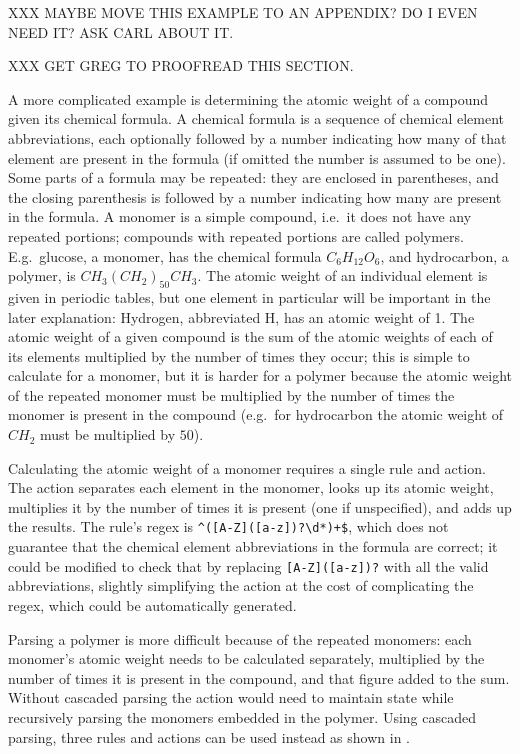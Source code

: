 XXX MAYBE MOVE THIS EXAMPLE TO AN APPENDIX\@?  DO I EVEN NEED IT\@?  ASK
CARL ABOUT IT\@.

XXX GET GREG TO PROOFREAD THIS SECTION\@.

A more complicated example is determining the atomic weight of a compound
given its chemical formula.  A chemical formula is a sequence of chemical
element abbreviations, each optionally followed by a number indicating how
many of that element are present in the formula (if omitted the number is
assumed to be one).  Some parts of a formula may be repeated: they are
enclosed in parentheses, and the closing parenthesis is followed by a
number indicating how many are present in the formula.  A monomer is a
simple compound, i.e.\ it does not have any repeated portions; compounds
with repeated portions are called polymers.  E.g.\ glucose, a monomer, has
the chemical formula $C_{6}H_{12}O_{6}$, and hydrocarbon, a polymer, is
$CH_{3}{(CH_{2})}_{50}CH_{3}$.  The atomic weight of an individual element
is given in periodic tables, but one element in particular will be
important in the later explanation: Hydrogen, abbreviated H, has an atomic
weight of 1.  The atomic weight of a given compound is the sum of the
atomic weights of each of its elements multiplied by the number of times
they occur; this is simple to calculate for a monomer, but it is harder for
a polymer because the atomic weight of the repeated monomer must be
multiplied by the number of times the monomer is present in the compound
(e.g.\ for hydrocarbon the atomic weight of $CH_{2}$ must be multiplied by
$50$).

Calculating the atomic weight of a monomer requires a single rule and
action.  The action separates each element in the monomer, looks up its
atomic weight, multiplies it by the number of times it is present (one if
unspecified), and adds up the results.  The rule's regex is
\verb!^([A-Z]([a-z])?\d*)+$!, which does not guarantee that the chemical
element abbreviations in the formula are correct; it could be modified to
check that by replacing \verb![A-Z]([a-z])?! with all the valid
abbreviations, slightly simplifying the action at the cost of complicating
the regex, which could be automatically generated.

Parsing a polymer is more difficult because of the repeated monomers: each
monomer's atomic weight needs to be calculated separately, multiplied by
the number of times it is present in the compound, and that figure added to
the sum.  Without cascaded parsing the action would need to maintain state
while recursively parsing the monomers embedded in the polymer.  Using
cascaded parsing, three rules and actions can be used instead as shown in
.

